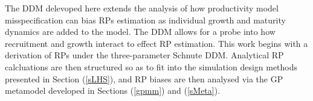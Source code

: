 %
The DDM delevoped here extends the analysis of how productivity model misspecification 
can bias RPs estimation as individual growth and maturity dynamics are added to the model. 
The DDM allows for a probe into how recruitment and growth interact to effect RP estimation.
This work begins with a derivation of RPs under the three-parameter Schnute 
DDM. Analytical RP calcluations are then structured so as to fit into the 
simulation design methods presented in Section (\ref{sLHS}), and RP biases are 
then analysed via the GP metamodel developed in Sections (\ref{gpmm}) and (\ref{sMeta}).


